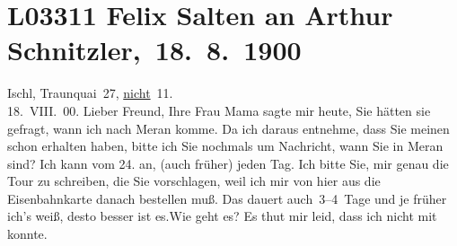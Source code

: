 

\section[ Felix Salten an Arthur Schnitzler, 18. 8. 1900]{L03311 Felix Salten an Arthur Schnitzler, 18. 8. 1900}
\nopagebreak{}
\rehead{ }\normalsize\beginnumbering{}
\toendnotes[C]{\smallbreak\pagebreak[2]}
\toendnotes[C]{\smallbreak}
\pstart
           \raggedleft{}{\pb}Ischl, Traunquai 27, \uline{nicht} 11. {\\}18. VIII. 00.\pend
           \vspace{0.5em}
\pstart
           Lieber Freund, Ihre Frau Mama sagte mir heute, Sie
               hätten sie gefragt, wann ich nach Meran komme.
               Da ich daraus entnehme, dass Sie meinen \label{K_L03311-1v}\label{K_L03311-1} schon erhalten haben, bitte ich Sie nochmals um Nachricht, wann Sie in Meran sind? Ich kann vom
                  24. an, (auch früher) jeden Tag. Ich bitte Sie, mir
               genau die Tour zu schreiben, die Sie vorschlagen, weil ich mir von hier aus die
               Eisenbahnkarte danach bestellen muß. Das dauert auch 3–4 Tage und je früher ich’s
               weiß, desto besser ist es.\hspace*{2em}Wie geht es? Es thut mir leid, dass ich nicht mit
               konnte.\pend
           
